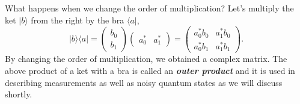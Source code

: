 What happens when we change the order of multiplication?
Let's multiply the ket $|b\rangle$ from the right by the bra $\langle a|$,
\begin{equation}
    | b\rangle \langle a | = \begin{pmatrix} b_0 \\ b_1 \end{pmatrix} \begin{pmatrix} a_0^* & a_1^* \end{pmatrix} = \begin{pmatrix} a_0^*b_0 & a_1^*b_0 \\ a_0^*b_1 & a_1^*b_1 \end{pmatrix}.
\end{equation}
By changing the order of multiplication, we obtained a complex matrix.
The above product of a ket with a bra is called an \textit{\textbf{outer product}} and it is used in describing measurements as well as noisy quantum states as we will discuss shortly.

